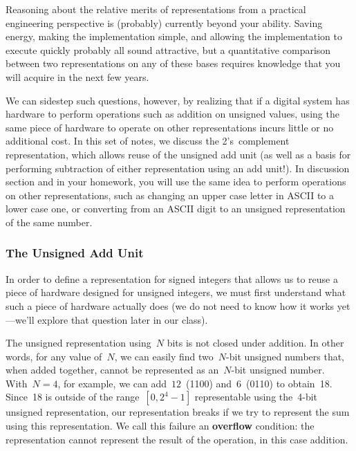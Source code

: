 Reasoning about the relative merits of representations from a
practical engineering perspective is (probably) currently beyond 
your ability.
%
Saving energy, making the implementation simple, and allowing the
implementation to execute quickly probably all sound attractive, but 
a quantitative comparison between two representations on any of these
bases requires knowledge that you will acquire in the
next few years.

We can sidestep such questions, however, by realizing that if a
digital system has hardware to perform operations such as addition
on unsigned values, using the same piece of hardware to operate
on other representations incurs little or no additional cost.
In this set of notes, we discuss the 2's~complement representation,
which allows reuse of the unsigned add unit (as well as a basis for
performing subtraction of either representation using an add unit!).
In discussion section and in your homework, you will 
use the same idea to perform operations on other representations, such as
changing an upper case letter in ASCII to a lower case one, or converting
from an ASCII digit to an unsigned representation of the same number.  \\

\subsubsection{The Unsigned Add Unit}

In order to define a representation for signed integers that allows
us to reuse a piece of hardware designed for unsigned integers, we
must first understand what such a piece of hardware actually does (we
do not need to know how it works yet---we'll explore that question 
later in our class).

The unsigned representation using~\mbox{$N$} bits is not closed
under addition.  In other words, for any value of~$N$, we can easily
find two~\mbox{$N$-bit} unsigned numbers that, when added together,
cannot be represented as an~\mbox{$N$-bit} unsigned number.  With~$N=4$, 
for example, we can add~$12$~(1100) and~$6$~(0110) to obtain~18.
Since~18 is outside of the range~$[0,2^4-1]$ representable using
the~\mbox{4-bit} unsigned representation, our representation breaks
if we try to represent the sum using this representation.  We call
this failure an {\bf overflow}\label{one:tcr:overflow} condition: the representation cannot
represent the result of the operation, in this case addition.

